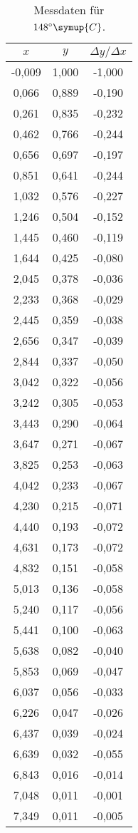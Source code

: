 \begin{longtable}{c c c}
	\caption{Messdaten für $148^\circ \symup{C}$.}
	\label{tab:148}\\
	\hline
	$x$ & $y$  & $\Delta y / \Delta x$ \\
	\hline
	-0,009&1,000&-1,000 \\
	0,066&0,889&-0,190 \\
	0,261&0,835&-0,232 \\
	0,462&0,766&-0,244 \\
	0,656&0,697&-0,197 \\
	0,851&0,641&-0,244 \\
	1,032&0,576&-0,227 \\
	1,246&0,504&-0,152 \\
	1,445&0,460&-0,119 \\
	1,644&0,425&-0,080 \\
	2,045&0,378&-0,036 \\
	2,233&0,368&-0,029 \\
	2,445&0,359&-0,038 \\
	2,656&0,347&-0,039 \\
	2,844&0,337&-0,050 \\
	3,042&0,322&-0,056 \\
	3,242&0,305&-0,053 \\
	3,443&0,290&-0,064 \\
	3,647&0,271&-0,067 \\
	3,825&0,253&-0,063 \\
	4,042&0,233&-0,067 \\
	4,230&0,215&-0,071 \\
	4,440&0,193&-0,072 \\
	4,631&0,173&-0,072 \\
	4,832&0,151&-0,058 \\
	5,013&0,136&-0,058 \\
	5,240&0,117&-0,056 \\
	5,441&0,100&-0,063 \\
	5,638&0,082&-0,040 \\
	5,853&0,069&-0,047 \\
	6,037&0,056&-0,033 \\
	6,226&0,047&-0,026 \\
	6,437&0,039&-0,024 \\
	6,639&0,032&-0,055 \\
	6,843&0,016&-0,014 \\
	7,048&0,011&-0,001 \\
	7,349&0,011&-0,005 \\

\end{longtable}
